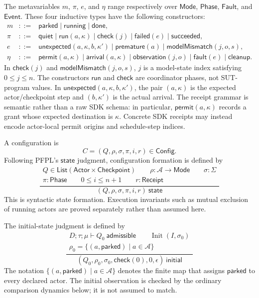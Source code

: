 \documentclass{article}
\newcommand{\Actor}{\mathsf{Actor}}
\newcommand{\Checkpoint}{\mathsf{Checkpoint}}
\newcommand{\State}{\Sigma}
\newcommand{\Mode}{\mathsf{Mode}}
\newcommand{\Phase}{\mathsf{Phase}}
\newcommand{\Fault}{\mathsf{Fault}}
\newcommand{\Event}{\mathsf{Event}}
\newcommand{\Receipt}{\mathsf{Receipt}}
\newcommand{\Config}{\mathsf{Config}}
\newcommand{\Parked}{\mathsf{parked}}
\newcommand{\Running}{\mathsf{running}}
\newcommand{\Done}{\mathsf{done}}
\newcommand{\Quiet}{\mathsf{quiet}}
\newcommand{\Run}{\mathsf{run}}
\newcommand{\CheckPhase}{\mathsf{check}}
\newcommand{\Failed}{\mathsf{failed}}
\newcommand{\Succeeded}{\mathsf{succeeded}}
\begin{document}
The metavariables $m$, $\pi$, $e$, and $\eta$ range respectively over
$\Mode$, $\Phase$, $\Fault$, and $\Event$. These four inductive types have the
following constructors:
\[
\begin{array}{rcl}
m&::=&\Parked\mid\Running\mid\Done,\\[2pt]
\pi&::=&\Quiet\mid\Run(a,\kappa)\mid\CheckPhase(j)
       \mid\Failed(e)\mid\Succeeded,\\[2pt]
e&::=&\mathsf{unexpected}(a,\kappa,b,\kappa')
       \mid\mathsf{premature}(a)
       \mid\mathsf{modelMismatch}(j,o,s),\\[2pt]
\eta&::=&\mathsf{permit}(a,\kappa)
       \mid\mathsf{arrival}(a,\kappa)
       \mid\mathsf{observation}(j,o)
       \mid\mathsf{fault}(e)
       \mid\mathsf{cleanup}.
\end{array}
\]
In $\CheckPhase(j)$ and $\mathsf{modelMismatch}(j,o,s)$, $j$ is a model-state
index satisfying $0\le j\le n$. The constructors $\Run$ and $\CheckPhase$ are
coordinator phases, not SUT-program values. In
$\mathsf{unexpected}(a,\kappa,b,\kappa')$, the pair $(a,\kappa)$ is the
expected actor/checkpoint step and $(b,\kappa')$ is the actual arrival.
The receipt grammar is semantic rather than a raw SDK schema: in particular,
$\mathsf{permit}(a,\kappa)$ records a grant whose expected destination is
$\kappa$. Concrete SDK receipts may instead encode actor-local permit origins
and schedule-step indices.

A configuration is
\[
  C=(Q,\rho,\sigma,\pi,i,r)\in\Config.
\]
Following PFPL's $\mathsf{state}$ judgment, configuration formation is defined
by
\[
\frac{
  \begin{array}{c}
    Q\in\mathsf{List}(\Actor\times\Checkpoint)\qquad
    \rho:\mathcal A\to\Mode\qquad
    \sigma:\State\\
    \pi:\Phase\qquad 0\le i\le n+1\qquad r:\Receipt
  \end{array}
}{
  (Q,\rho,\sigma,\pi,i,r)\ \mathsf{state}
}
\]
This is syntactic state formation. Execution invariants such as mutual
exclusion of running actors are proved separately rather than assumed here.

The initial-state judgment is defined by
\[
\frac{
  \begin{array}{c}
    D;\tau;\mu\vdash Q_0\ \mathsf{admissible}\qquad
    \operatorname{Init}(I,\sigma_0)\\
    \rho_0=\{(a,\Parked)\mid a\in\mathcal A\}
  \end{array}
}{
  (Q_0,\rho_0,\sigma_0,\CheckPhase(0),0,\epsilon)\ \mathsf{initial}
}
\]
The notation $\{(a,\Parked)\mid a\in\mathcal A\}$ denotes the finite map that
assigns $\Parked$ to every declared actor. The initial observation is checked
by the ordinary comparison dynamics below; it is not assumed to match.
\end{document}
